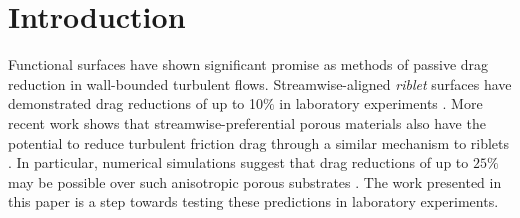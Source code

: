 \documentclass[letterpaper,11pt]{article}
\begin{document}
\section{Introduction}\label{sec:intro}
Functional surfaces have shown significant promise as methods of passive drag reduction in wall-bounded turbulent flows.  Streamwise-aligned \textit{riblet} surfaces have demonstrated drag reductions of up to 10$\%$ in laboratory experiments \citep{walsh1984optimization,bechert1997experiments,bechert2000experiments,garcia2011drag,garcia2011hydrodynamic}. 
More recent work shows that streamwise-preferential porous materials also have the potential to reduce turbulent friction drag through a similar mechanism to riblets \citep{nabil_garcia_dragreduction}.  In particular, numerical simulations suggest that drag reductions of up to $25\%$ may be possible over such anisotropic porous substrates \citep{rosti2018turbulent,gomez2019turbulent}. The work presented in this paper is a step towards testing these predictions in laboratory experiments. 
\end{document}
